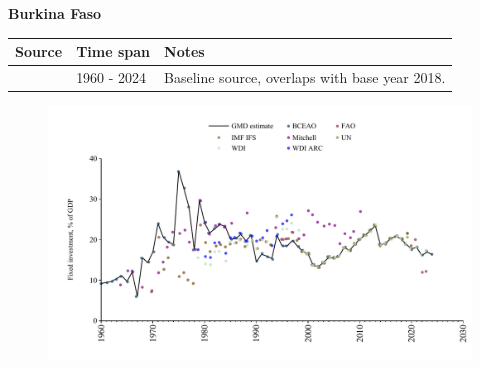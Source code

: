 \documentclass[12pt,a4paper,landscape]{article}
\begin{document}
\begin{adjustbox}{max totalsize={\paperwidth}{\paperheight},center}
\begin{minipage}[t][\textheight][t]{\textwidth}
\vspace*{0.5cm}
{}
\begin{center}
{\Large\bfseries Burkina Faso}
\end{center}
\vspace{0.5cm}
\begin{table}[H]
\centering
\small
\begin{tabular}{|l|l|l|}
\hline
\textbf{Source} & \textbf{Time span} & \textbf{Notes} \\
\hline
\rowcolor{white}\cite{BCEAO}& 1960 - 2024 &Baseline source, overlaps with base year 2018.\\
\hline
\end{tabular}
\end{table}
\begin{figure}[H]
\centering
\includegraphics[width=\textwidth,height=0.6\textheight,keepaspectratio]{graphs/BFA_finv_GDP.pdf}
\end{figure}
\end{minipage}
\end{adjustbox}
\end{document}
